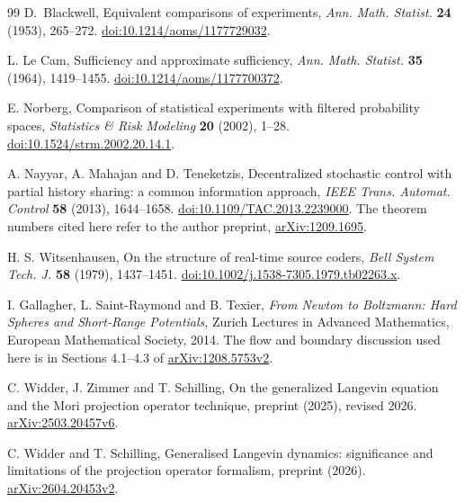 \begin{thebibliography}{99}
D.~Blackwell, Equivalent comparisons of experiments,
\emph{Ann. Math. Statist.} \textbf{24} (1953), 265--272.
\href{https://doi.org/10.1214/aoms/1177729032}{doi:10.1214/aoms/1177729032}.

L. Le Cam, Sufficiency and approximate sufficiency,
\emph{Ann. Math. Statist.} \textbf{35} (1964), 1419--1455.
\href{https://doi.org/10.1214/aoms/1177700372}{doi:10.1214/aoms/1177700372}.

E. Norberg, Comparison of statistical experiments with filtered
probability spaces, \emph{Statistics \& Risk Modeling} \textbf{20}
(2002), 1--28.
\href{https://doi.org/10.1524/strm.2002.20.14.1}{doi:10.1524/strm.2002.20.14.1}.

A. Nayyar, A. Mahajan and D. Teneketzis,
Decentralized stochastic control with partial history sharing:
a common information approach,
\emph{IEEE Trans. Automat. Control} \textbf{58} (2013), 1644--1658.
\href{https://doi.org/10.1109/TAC.2013.2239000}{doi:10.1109/TAC.2013.2239000}.
The theorem numbers cited here refer to the author preprint,
\href{https://arxiv.org/abs/1209.1695}{arXiv:1209.1695}.

H. S. Witsenhausen, On the structure of real-time source coders,
\emph{Bell System Tech. J.} \textbf{58} (1979), 1437--1451.
\href{https://doi.org/10.1002/j.1538-7305.1979.tb02263.x}{doi:10.1002/j.1538-7305.1979.tb02263.x}.


I. Gallagher, L. Saint-Raymond and B. Texier,
\emph{From Newton to Boltzmann: Hard Spheres and Short-Range Potentials},
Zurich Lectures in Advanced Mathematics, European Mathematical Society, 2014.
The flow and boundary discussion used here is in Sections 4.1--4.3 of
\href{https://arxiv.org/abs/1208.5753v2}{arXiv:1208.5753v2}.

C. Widder, J. Zimmer and T. Schilling,
On the generalized Langevin equation and the Mori projection operator technique,
preprint (2025), revised 2026.
\href{https://arxiv.org/abs/2503.20457v6}{arXiv:2503.20457v6}.

C. Widder and T. Schilling,
Generalised Langevin dynamics: significance and limitations of the
projection operator formalism, preprint (2026).
\href{https://arxiv.org/abs/2604.20453v2}{arXiv:2604.20453v2}.


\end{thebibliography}
